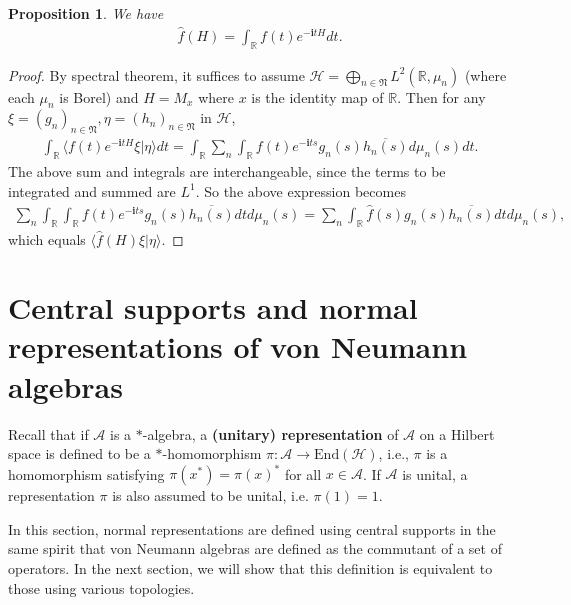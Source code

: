 \documentclass[12pt,b5paper,notitlepage]{article}
\theoremstyle{definition}
\theoremstyle{plain}
\newtheorem{pp}[df]{Proposition}
\newcommand{\fk}{\mathfrak}
\newcommand{\mc}{\mathcal}
\newcommand{\wht}{\widehat}
\newcommand{\ovl}{\overline}
\newcommand{\End}{\mathrm{End}} %
\newcommand{\bk}[1]{\langle {#1}\rangle}
\newcommand{\scr}{\mathscr}
\newcommand{\im}{\mathbf{i}}
\newcommand{\Rbb}{\mathbb R}
\numberwithin{equation}{section}
\begin{document}
\begin{pp}
We have
\begin{align*}
\wht f(H)=	\int_\Rbb f(t)e^{-\im tH}dt.
\end{align*}
\end{pp}



\begin{proof}
By spectral theorem, it suffices to assume $\mc H=\bigoplus_{n\in\fk N}L^2(\Rbb,\mu_n)$ (where each $\mu_n$ is Borel) and $H=M_x$ where $x$ is the identity map of $\Rbb$. Then for any $\xi=(g_n)_{n\in\fk N},\eta=(h_n)_{n\in\fk N}$ in $\mc H$, 
\begin{align*}
\int_\Rbb\bk{f(t)e^{-\im tH}\xi|\eta}dt=\int_\Rbb\sum_n \int_\Rbb f(t)e^{-\im ts}g_n(s)\ovl{h_n(s)}d\mu_n(s)dt.	
\end{align*}
The above sum and integrals are interchangeable, since the terms to be integrated and summed are $L^1$. So the above expression becomes
\begin{align*}
\sum_n \int_\Rbb \int_\Rbb f(t)e^{-\im ts}g_n(s)\ovl{h_n(s)}dt d\mu_n(s)=	\sum_n \int_\Rbb  \wht f(s)g_n(s)\ovl{h_n(s)}dt d\mu_n(s),
\end{align*}
which equals $\bk{\wht f(H)\xi|\eta}$.
\end{proof}













\section{Central supports and normal representations of von Neumann algebras}


Recall that if $\scr A$ is a $*$-algebra, a \textbf{(unitary) representation} of $\scr A$ on a Hilbert space is defined to be a $*$-homomorphism $\pi:\scr A\rightarrow\End(\mc H)$, i.e., $\pi$ is a homomorphism satisfying $\pi(x^*)=\pi(x)^*$ for all $x\in\scr A$. If $\scr A$ is unital, a representation $\pi$ is also assumed to be unital, i.e. $\pi(1)=1$.


In this section, normal representations are defined using central supports in the same spirit that von Neumann algebras are defined as the commutant of a set of operators. In the next section, we will show that this definition is equivalent to those using various topologies.
\end{document}

